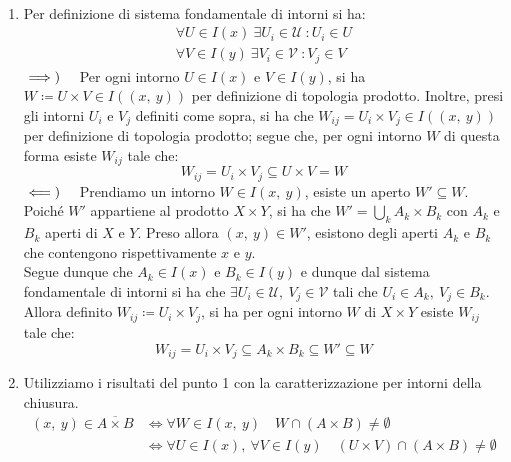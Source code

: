 \begin{demonstration}~{}
	\begin{enumerate}[label=\Roman*]
		\item Per definizione di sistema fondamentale di intorni si ha:
		\begin{gather*}
			\forall U\in I\left(x\right)\ \exists U_i\in\mathcal{U}\ \colon U_i\in U\\
			\forall V\in I\left(y\right)\ \exists V_i\in\mathcal{V}\ \colon V_j\in V
		\end{gather*}
		$\implies)\quad$ Per ogni intorno $U\in I\left(x\right)$ e $V\in I\left(y\right)$, si ha $W\coloneqq U\times V\in I\left(\left(x,\ y\right)\right)$ per definizione di topologia prodotto. Inoltre, presi gli intorni $U_i$ e $V_j$ definiti come sopra, si ha che $W_{ij} = U_i \times V_j\in I\left(\left(x,\ y\right)\right)$ per definizione di topologia prodotto; segue che, per ogni intorno $W$ di questa forma esiste $W_{ij}$ tale che:
		\begin{equation*}
			W_{ij} = U_i \times V_j\subseteq U\times V= W
		\end{equation*}
		$\impliedby)\quad$ Prendiamo un intorno $W\in I\left(x,\ y\right)$, esiste un aperto $W'\subseteq W$. Poiché $W'$ appartiene al prodotto $X\times Y$, si ha che $\displaystyle W'=\bigcup_k A_k\times B_k$ con $A_k$ e $B_k$ aperti di $X$ e $Y$. Preso allora $\left(x,\ y\right)\in W'$, esistono degli aperti $A_k$ e $B_k$ che contengono rispettivamente $x$ e $y$.\\
		Segue dunque che $A_k\in I\left(x\right)$ e $B_k\in I\left(y\right)$ e dunque dal sistema fondamentale di intorni si ha che $\exists U_i\in\mathcal{U},\ V_j\in\mathcal{V}$ tali che $U_i\in A_k,\  V_j\in B_k$. Allora definito $W_{ij} \coloneqq U_i \times V_j$, si ha per ogni intorno $W$ di $X\times Y$ esiste $W_{ij}$ tale che:
		\begin{equation*}
			W_{ij} = U_i \times V_j\subseteq A_k\times B_k\subseteq W'\subseteq W
		\end{equation*}
		\item Utilizziamo i risultati del punto 1 con la caratterizzazione per intorni della chiusura.
		\begin{align*}
			\left(x,\ y\right)\in \overline{A\times B}&\iff \forall W\in I\left(x,\ y\right)\quad W\cap\left(A\times B\right)\neq \emptyset\\
			&\iff \forall U\in I\left(x\right),\ \forall V\in I\left(y\right)\quad \left(U\times V\right)\cap\left(A\times B\right)\neq \emptyset\\

\end{align*}
\end{enumerate}
\end{demonstration}
